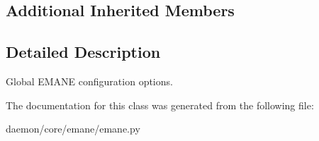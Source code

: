 \subsection*{Additional Inherited Members}


\subsection{Detailed Description}
\begin{DoxyVerb}Global EMANE configuration options.
\end{DoxyVerb}
 

The documentation for this class was generated from the following file\+:\begin{DoxyCompactItemize}
\item 
daemon/core/emane/emane.\+py\end{DoxyCompactItemize}
